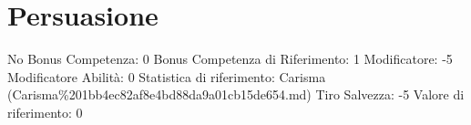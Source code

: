 \section{Persuasione}\label{persuasione}

\begin{description}
\tightlist
\item[Tags: ABI]
No Bonus Competenza: 0 Bonus Competenza di Riferimento: 1 Modificatore:
-5 Modificatore Abilità: 0 Statistica di riferimento: Carisma
(Carisma\%201bb4ec82af8e4bd88da9a01cb15de654.md) Tiro Salvezza: -5
Valore di riferimento: 0
\end{description}
